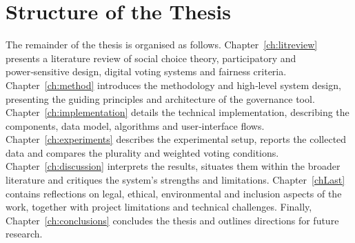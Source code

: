 \section{Structure of the Thesis}

The remainder of the thesis is organised as follows.  Chapter~\ref{ch:litreview}
presents a literature review of social choice theory, participatory and
power‑sensitive design, digital voting systems and fairness criteria.
Chapter~\ref{ch:method} introduces the methodology and high‑level system
design, presenting the guiding principles and architecture of the governance
tool.  Chapter~\ref{ch:implementation} details the technical implementation,
describing the components, data model, algorithms and user‑interface flows.
Chapter~\ref{ch:experiments} describes the experimental setup, reports the collected data and compares the plurality and weighted voting conditions.
Chapter~\ref{ch:discussion} interprets the results, situates them within
the broader literature and critiques the system’s strengths and limitations.
Chapter~\ref{chLast} contains reflections on legal, ethical, environmental
and inclusion aspects of the work, together with project limitations and
technical challenges.  Finally, Chapter~\ref{ch:conclusions} concludes the
thesis and outlines directions for future research.